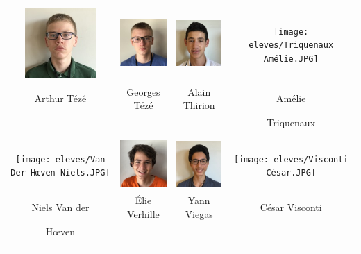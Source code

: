 \vfill
\pagebreak

\begin{center}
\begin{tabular}{cccc}
 \includegraphics[angle=270,origin=c, width=27mm]{eleves/Tézé Arthur.JPG} &
\includegraphics[angle=270,origin=c, width=27mm]{eleves/Tézé Georges.JPG} &
\includegraphics[angle=270,origin=c, width=27mm]{eleves/Thirion Alain.JPG} &
\texttt{[image: eleves/Triquenaux Amélie.JPG]} \\
Arthur Tézé & Georges Tézé & Alain Thirion & Amélie \\ & & & Triquenaux \\ \\ \\ 

\texttt{[image: eleves/Van Der Hœven Niels.JPG]} &
\includegraphics[angle=270,origin=c, width=27mm]{eleves/Verhille Elie.JPG} &
\includegraphics[angle=270,origin=c, width=27mm]{eleves/Viegas Yann.JPG} &
\texttt{[image: eleves/Visconti César.JPG]} \\
Niels Van der & Élie Verhille & Yann Viegas & César Visconti \\  Hœven & & & \\ \\ \\ 


\end{tabular}
\end{center}

